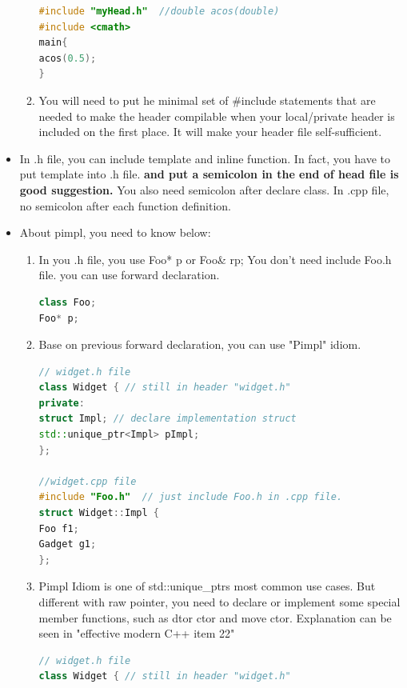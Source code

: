 \documentclass[a4paper,12pt,twoside]{book}
\begin{document}
\begin{itemize}
\begin{enumerate}
\begin{lstlisting}[frame=single, language=c++]
#include "myHead.h"  //double acos(double)
#include <cmath>
main{
acos(0.5);
}
\end{lstlisting}

\item You will need to put he minimal set of \#include statements that are needed to make the header compilable when your local/private header is included on the first place.  It will make your header file self-sufficient.
\end{enumerate}

\item In .h file, you can include template and inline function.  In fact, you have to put template into .h file. \textbf{and put a semicolon in the end of head file is good suggestion.} You also need semicolon after declare class. In .cpp file, no semicolon after each function definition.

\item About pimpl, you need to know below:

\begin{enumerate}
\item In you .h file, you use Foo* p or Foo\& rp; You don't need include Foo.h file. you can use forward declaration.
\begin{lstlisting}[frame=single, language=c++]
class Foo;
Foo* p;
\end{lstlisting}
\item Base on previous forward declaration, you can use "Pimpl" idiom.
\begin{lstlisting}[frame=single, language=c++]
// widget.h file
class Widget { // still in header "widget.h"
private:
struct Impl; // declare implementation struct
std::unique_ptr<Impl> pImpl;
};

//widget.cpp file
#include "Foo.h"  // just include Foo.h in .cpp file.
struct Widget::Impl {
Foo f1;
Gadget g1;
};
\end{lstlisting}


\item   Pimpl Idiom is one of std::unique\_ptrs most common use cases. But different with raw pointer,  you need to declare or implement some special member functions, such as dtor ctor and move ctor. Explanation can be seen in "effective modern C++ item 22"
\begin{lstlisting}[frame=single, language=c++, mathescape=true]
// widget.h file
class Widget { // still in header "widget.h"


\end{lstlisting}
\end{enumerate}
\end{itemize}
\end{document}
